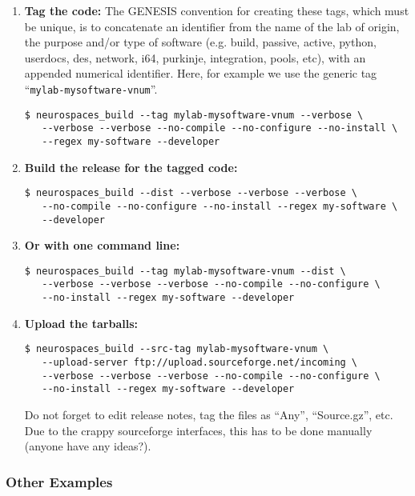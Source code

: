 \documentclass[12pt]{article}
\begin{document}
\begin{enumerate}

\item {\bf Tag the code:} The GENESIS convention for creating these tags, which must be unique, is to concatenate an identifier from the name of the lab of origin, the purpose and/or type of software (e.g. build, passive, active, python, userdocs, des, network, i64, purkinje, integration, pools, etc), with an appended numerical identifier. Here, for example we use the generic tag ``{\tt mylab-mysoftware-vnum}''.
\begin{verbatim}
$ neurospaces_build --tag mylab-mysoftware-vnum --verbose \
   --verbose --verbose --no-compile --no-configure --no-install \
   --regex my-software --developer
\end{verbatim}

\item {\bf Build the release for the tagged code:}
\begin{verbatim}
$ neurospaces_build --dist --verbose --verbose --verbose \
   --no-compile --no-configure --no-install --regex my-software \
   --developer
\end{verbatim}

\item {\bf Or with one command line:}
\begin{verbatim}
$ neurospaces_build --tag mylab-mysoftware-vnum --dist \
   --verbose --verbose --verbose --no-compile --no-configure \
   --no-install --regex my-software --developer
\end{verbatim}

\item {\bf Upload the tarballs:}
\begin{verbatim}
$ neurospaces_build --src-tag mylab-mysoftware-vnum \
   --upload-server ftp://upload.sourceforge.net/incoming \
   --verbose --verbose --verbose --no-compile --no-configure \
   --no-install --regex my-software --developer
\end{verbatim}
Do not forget to edit release notes, tag the files as ``Any'', ``Source.gz'', etc. Due to the crappy sourceforge interfaces, this has to be done manually (anyone have any ideas?).

\end{enumerate}

\subsubsection*{Other Examples}
\end{document}
